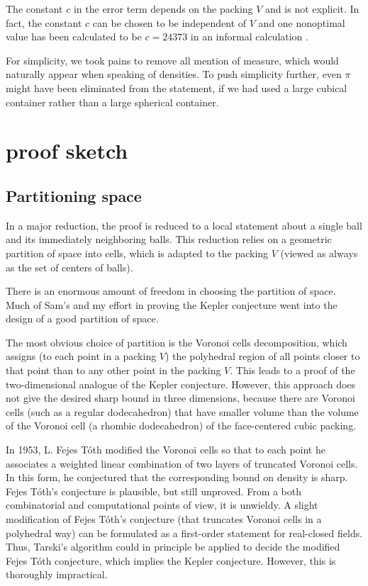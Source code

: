 \documentclass{amsart}
\begin{document}
The constant $c$ in
the error term depends on the packing $V$ and is not explicit.  In
fact, the constant $c$ can be chosen to be independent of $V$ and one
nonoptimal value has been calculated to be $c=24373$ in an informal
calculation \cite{XX}.

For simplicity, we took pains to remove all mention of
measure, which would naturally appear when speaking of densities.  To
push simplicity further, even $\pi$ might have been eliminated from
the statement, if we had used a large cubical container rather than a
large spherical container.



\section{proof sketch}

\subsection{Partitioning space}

In a major reduction, the proof is reduced to a local statement
about a single ball and its immediately neighboring balls.
This reduction relies on a geometric partition of space into cells,
which is adapted to the packing $V$ (viewed as always as the set of centers
of balls).

There is an enormous amount of freedom in choosing the partition
of space.  Much of Sam's and my effort in proving the Kepler conjecture
went into the design of a good partition of space.  

The most obvious choice of partition is the Voronoi cells
decomposition, which assigns (to each point in a packing $V$) the
polyhedral region of all points closer to that point than to any other
point in the packing $V$. This leads to a proof of the two-dimensional
analogue of the Kepler conjecture.  However, this approach does not
give the desired sharp bound in three dimensions, because there are
Voronoi cells (such as a regular dodecahedron) that have smaller
volume than the volume of the Voronoi cell (a rhombic dodecahedron) of
the face-centered cubic packing.

In 1953, L. Fejes T\'oth modified the Voronoi cells so that to each
point he associates a weighted linear combination of two layers of
truncated Voronoi cells.  In this form, he conjectured that the
corresponding bound on density is sharp.  Fejes T\'oth's conjecture is
plausible, but still unproved.  From a both combinatorial and
computational points of view, it is unwieldy.  A slight modification
of Fejes T\'oth's conjecture (that truncates Voronoi cells in a
polyhedral way) can be formulated as a first-order statement for
real-closed fields.  Thus, Tarski's algorithm could in principle be
applied to decide the modified Fejes T\'oth conjecture, which implies
the Kepler conjecture.  However, this is thoroughly impractical.
\end{document}
